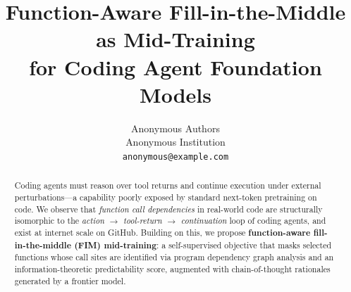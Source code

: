 \documentclass{article}
\title{Function-Aware Fill-in-the-Middle as Mid-Training\\for Coding Agent Foundation Models}
\author{%
  Anonymous Authors \\
  Anonymous Institution \\
  \texttt{anonymous@example.com}
}
\begin{document}
\maketitle

\begin{abstract}
Coding agents must reason over tool returns and continue execution under
external perturbations---a capability poorly exposed by standard next-token
pretraining on code. We observe that \emph{function call dependencies} in
real-world code are structurally isomorphic to the
\textit{action $\rightarrow$ tool-return $\rightarrow$ continuation} loop of
coding agents, and exist at internet scale on GitHub. Building on this, we
propose \textbf{function-aware fill-in-the-middle (FIM) mid-training}: a
self-supervised objective that masks selected functions whose call sites are
identified via program dependency graph analysis and an information-theoretic
predictability score, augmented with chain-of-thought rationales generated by
a frontier model.
\end{abstract}
\end{document}

